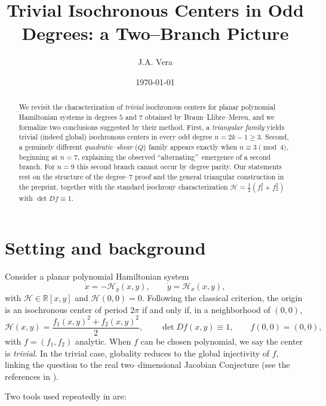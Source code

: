 \documentclass[11pt]{article}%
\theoremstyle{plain}
\theoremstyle{definition}
\begin{document}
\title{Trivial Isochronous Centers in Odd Degrees: a Two--Branch Picture}
\author{J.A. Vera}
\date{\today}
\maketitle

\begin{abstract}
We revisit the characterization of \emph{trivial} isochronous centers for
planar polynomial Hamiltonian systems in degrees $5$ and $7$ obtained by
Braun--Llibre--Mereu, and we formalize two conclusions suggested by their
method. First, a \emph{triangular family} yields trivial (indeed global)
isochronous centers in every odd degree $n=2k-1\geq3$. Second, a genuinely
different \emph{quadratic--shear} ($Q$) family appears exactly when
$n\equiv3\pmod 4$, beginning at $n=7$, explaining the observed
\textquotedblleft alternating\textquotedblright\ emergence of a second branch.
For $n=9$ this second branch cannot occur by degree parity. Our statements
rest on the structure of the degree--7 proof and the general triangular
construction in the preprint, together with the standard isochrony
characterization $\mathcal{H}=\tfrac{1}{2}(f_{1}^{2}+f_{2}^{2})$ with $\det
Df\equiv1$.

\end{abstract}

\section{Setting and background}

Consider a planar polynomial Hamiltonian system
\[
\dot{x}=-\mathcal{H}_{y}(x,y),\qquad\dot{y}=\mathcal{H}_{x}(x,y),
\]
with $\mathcal{H}\in\mathbb{R}[x,y]$ and $\mathcal{H}(0,0)=0$. Following the
classical criterion, the origin is an isochronous center of period $2\pi$ if
and only if, in a neighborhood of $(0,0)$,
\begin{equation}
\mathcal{H}(x,y)=\frac{f_{1}(x,y)^{2}+f_{2}(x,y)^{2}}{2},\qquad\det
Df(x,y)\equiv1,\qquad f(0,0)=(0,0),\label{eq:iso-criterion}%
\end{equation}
with $f=(f_{1},f_{2})$ analytic. When $f$ can be chosen polynomial, we say the
center is \emph{trivial}. In the trivial case, globality reduces to the global
injectivity of $f$, linking the question to the real two--dimensional Jacobian
Conjecture (see the references in \cite{BraLliMer}).

Two tools used repeatedly in \cite{BraLliMer} are:
\end{document}
